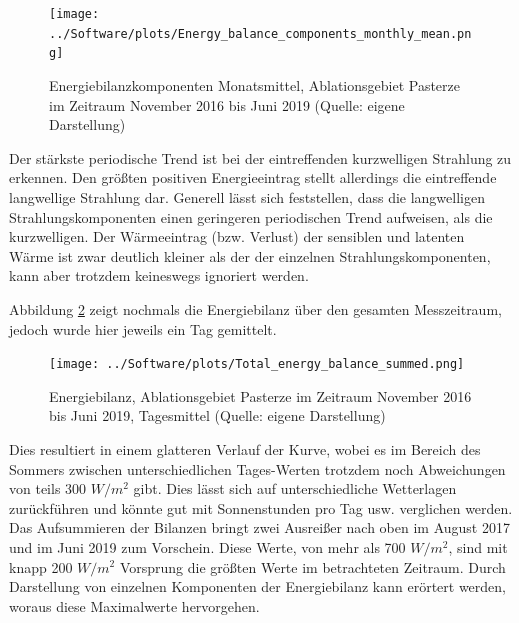 \documentclass[11pt,a4paper]{article}
\begin{document}
\begin{figure}[H]
\centering
\texttt{[image: ../Software/plots/Energy\_balance\_components\_monthly\_mean.png]}
\caption[Energiebilanzkomponenten Monatsmittel, Ablationsgebiet Pasterze im Zeitraum November 2016 bis Juni 2019]{Energiebilanzkomponenten Monatsmittel, Ablationsgebiet Pasterze im Zeitraum November 2016 bis Juni 2019 (Quelle: eigene Darstellung)}
\label{Energiebilanzkomponenten Monatsmittel}
\end{figure}

Der stärkste periodische Trend ist bei der eintreffenden kurzwelligen Strahlung zu erkennen. Den größten positiven Energieeintrag stellt allerdings die eintreffende langwellige  Strahlung dar. Generell lässt sich feststellen, dass die langwelligen Strahlungskomponenten einen geringeren periodischen Trend aufweisen, als die kurzwelligen. Der Wärmeeintrag (bzw. Verlust) der sensiblen und latenten Wärme ist zwar deutlich kleiner als der der einzelnen Strahlungskomponenten, kann aber trotzdem keineswegs ignoriert werden. 



\pagebreak
Abbildung \ref{Energiebilanz gesamter Messzeitraum, Tagesmittel} zeigt nochmals die Energiebilanz über den gesamten Messzeitraum, jedoch wurde hier jeweils ein Tag gemittelt.

\begin{figure}[H]
\centering
\texttt{[image: ../Software/plots/Total\_energy\_balance\_summed.png]}
\caption[Energiebilanz, Ablationsgebiet Pasterze im Zeitraum November 2016 bis Juni 2019, Tagesmittel]{Energiebilanz, Ablationsgebiet Pasterze im Zeitraum November 2016 bis Juni 2019, Tagesmittel (Quelle: eigene Darstellung)}
\label{Energiebilanz gesamter Messzeitraum, Tagesmittel}
\end{figure}

Dies resultiert in einem glatteren Verlauf der Kurve, wobei es im Bereich des Sommers zwischen unterschiedlichen Tages-Werten trotzdem noch Abweichungen von teils 300 $W/m^2$ gibt. Dies lässt sich auf unterschiedliche Wetterlagen zurückführen und könnte gut mit Sonnenstunden pro Tag usw. verglichen werden.\\
Das Aufsummieren der Bilanzen bringt zwei Ausreißer nach oben im August 2017 und im Juni 2019 zum Vorschein. Diese Werte, von mehr als 700 $W/m^2$, sind mit knapp 200 $W/m^2$ Vorsprung die größten Werte im betrachteten Zeitraum. Durch Darstellung von einzelnen Komponenten der Energiebilanz kann erörtert werden, woraus diese Maximalwerte hervorgehen.\\
\end{document}
